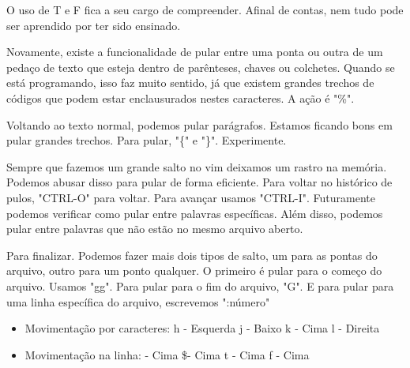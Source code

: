 \documentclass[a4paper, 12pt]{article}
\begin{document}
O uso de T e F fica a seu cargo de compreender.
Afinal de contas, nem tudo pode ser aprendido por ter sido ensinado.

Novamente, existe a funcionalidade de pular entre uma ponta ou outra de um pedaço de texto que esteja dentro de parênteses, chaves ou colchetes.
Quando se está programando, isso faz muito sentido, já que existem grandes trechos de códigos que podem estar enclausurados nestes caracteres.
A ação é "\%".

Voltando ao texto normal, podemos pular parágrafos.
Estamos ficando bons em pular grandes trechos.
Para pular, "\{" e "\}". Experimente.

Sempre que fazemos um grande salto no vim deixamos um rastro na memória.
Podemos abusar disso para pular de forma eficiente.
Para voltar no histórico de pulos, "CTRL-O" para voltar.
Para avançar usamos "CTRL-I".
Futuramente podemos verificar como pular entre palavras específicas.
Além disso, podemos pular entre palavras que não estão no mesmo arquivo aberto.

Para finalizar.
Podemos fazer mais dois tipos de salto, um para as pontas do arquivo, outro para um ponto qualquer.
O primeiro é pular para o começo do arquivo.
Usamos "gg".
Para pular para o fim do arquivo, "G".
E para pular para uma linha específica do arquivo, escrevemos ":número"

\begin{itemize}
    \item Movimentação por caracteres:
        \subitem h - Esquerda
        \subitem j - Baixo
        \subitem k - Cima
        \subitem l - Direita
    \item Movimentação na linha:
         - Cima
        \subitem \$- Cima
        \subitem t - Cima
        \subitem f - Cima

\end{itemize}
    
\end{document}
